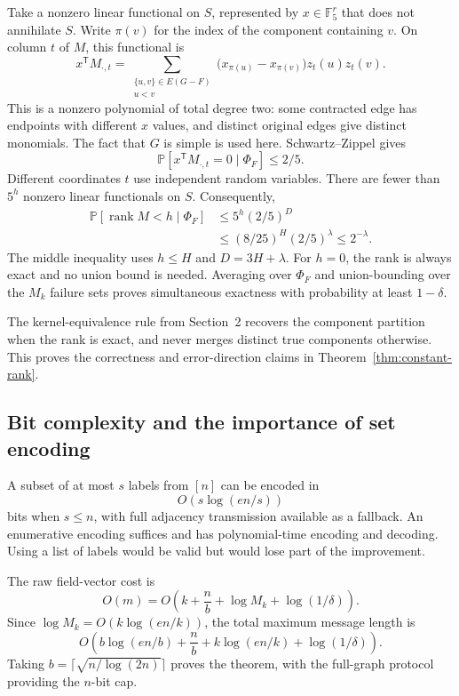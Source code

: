 \documentclass[11pt]{article}
\theoremstyle{remark}\newtheorem{remark}[theorem]{Remark}
\newcommand{\F}{\mathbb F}
\newcommand{\Prb}{\mathbb P}
\newcommand{\rank}{\operatorname{rank}}
\begin{document}
Take a nonzero linear functional on $S$, represented by $x\in\F_5^r$ that does not annihilate $S$. Write $\pi(v)$ for the index of the component containing $v$. On column $t$ of $M$, this functional is
\begin{equation}\label{eq:cut-poly}
 x^{\mathsf T}M_{\cdot,t}=
 \sum_{\substack{\{u,v\}\in E(G-F)\\u<v}}
 \bigl(x_{\pi(u)}-x_{\pi(v)}\bigr)z_t(u)z_t(v).
\end{equation}
This is a nonzero polynomial of total degree two: some contracted edge has endpoints with different $x$ values, and distinct original edges give distinct monomials. The fact that $G$ is simple is used here. Schwartz--Zippel gives
\[
 \Prb[x^{\mathsf T}M_{\cdot,t}=0\mid\Phi_F]\le 2/5.
\]
Different coordinates $t$ use independent random variables. There are fewer than $5^h$ nonzero linear functionals on $S$. Consequently,
\begin{align*}
 \Prb[\rank M<h\mid\Phi_F]
 &\le 5^h(2/5)^D\\
 &\le (8/25)^H(2/5)^\lambda
 \le 2^{-\lambda}.
\end{align*}
The middle inequality uses $h\le H$ and $D=3H+\lambda$. For $h=0$, the rank is always exact and no union bound is needed. Averaging over $\Phi_F$ and union-bounding over the $M_k$ failure sets proves simultaneous exactness with probability at least $1-\delta$.

The kernel-equivalence rule from Section~2 recovers the component partition when the rank is exact, and never merges distinct true components otherwise. This proves the correctness and error-direction claims in Theorem~\ref{thm:constant-rank}.

\subsection{Bit complexity and the importance of set encoding}
A subset of at most $s$ labels from $[n]$ can be encoded in
\[
 O\!\left(s\log(en/s)\right)
\]
bits when $s\le n$, with full adjacency transmission available as a fallback. An enumerative encoding suffices and has polynomial-time encoding and decoding. Using a list of labels would be valid but would lose part of the improvement.

The raw field-vector cost is
\[
 O(m)=O\!\left(k+\frac nb+\log M_k+\log(1/\delta)\right).
\]
Since $\log M_k=O(k\log(en/k))$, the total maximum message length is
\[
 O\!\left(
 b\log(en/b)+\frac nb+k\log(en/k)+\log(1/\delta)
 \right).
\]
Taking $b=\lceil\sqrt{n/\log(2n)}\rceil$ proves the theorem, with the full-graph protocol providing the $n$-bit cap.
\end{document}
